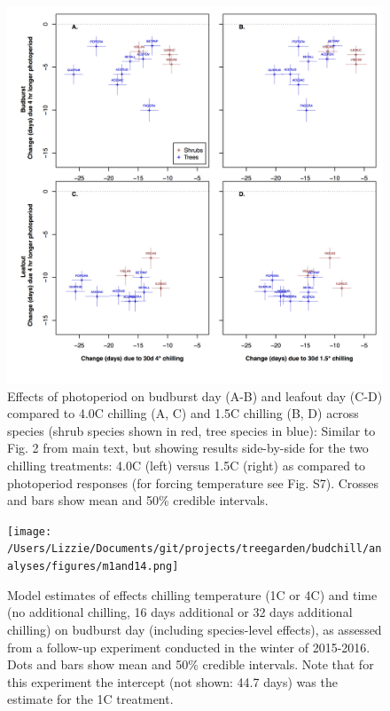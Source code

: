 \documentclass{article}
\begin{document}
\begin{figure}
\label{fig:figS7}
\includegraphics[width=1\textwidth]{FigChillPhoto_4panel.png}
\caption{Effects of photoperiod on budburst day (A-B) and leafout day (C-D) compared to 4.0\degree C chilling (A, C) and 1.5\degree C chilling (B, D) across species (shrub species shown in red, tree species in blue): Similar to Fig. 2 from main text, but showing results side-by-side for the two chilling treatments: 4.0\degree C (left) versus 1.5\degree C (right) as compared to photoperiod responses (for forcing temperature see Fig. S7). Crosses and bars show mean and 50\% credible intervals.}
\end{figure}

\begin{figure}
\texttt{[image: /Users/Lizzie/Documents/git/projects/treegarden/budchill/analyses/figures/m1and14.png]} %
\caption{Model estimates of effects chilling temperature (1\degree C or 4\degree C) and time (no additional chilling, 16 days additional or 32 days additional chilling) on budburst day (including species-level effects), as assessed from a follow-up experiment conducted in the winter of 2015-2016. Dots and bars show mean and 50\% credible intervals. Note that for this experiment the intercept (not shown: 44.7 days) was the estimate for the 1\degree C treatment.}
\label{fig:figbudchill}
\end{figure}
\end{document}
